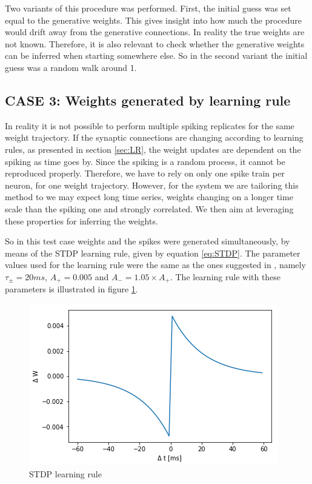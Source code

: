 Two variants of this procedure was performed. First, the initial guess was set equal to the generative weights. This gives insight into how much the procedure would drift away from the generative connections. In reality the true weights are not known. Therefore, it is also relevant to check whether the generative weights can be inferred when starting somewhere else. So in the second variant the initial guess was a random walk around 1. 

\subsection{CASE 3: Weights generated by learning rule}
In reality it is not possible to perform multiple spiking replicates for the same weight trajectory. If the synaptic connections are changing according to learning rules, as presented in section \ref{sec:LR}, the weight updates are dependent on the spiking as time goes by. Since the spiking is a random process, it cannot be reproduced properly. Therefore, we have to rely on only one spike train per neuron, for one weight trajectory. However, for the system we are tailoring this method to we may expect long time series, weights changing on a longer time scale than the spiking one and strongly correlated. We then aim at leveraging these properties for inferring the weights. 

So in this test case weights and the spikes were generated simultaneously, by means of the STDP learning rule, given by equation \ref{eq:STDP}. The parameter values used for the learning rule were the same as the ones suggested in \cite{Song}, namely $\tau_{\pm} = 20 ms$, $A_+ = 0.005$ and $A_- = 1.05 \times A_+$. The learning rule with these parameters is illustrated in figure \ref{fig:LR}.

\begin{figure}[hbt!]
\caption{STDP learning rule}
\label{fig:LR}
    \centering
    \includegraphics[scale=0.8]{fig/Learning_rule2.png}
\end{figure}

